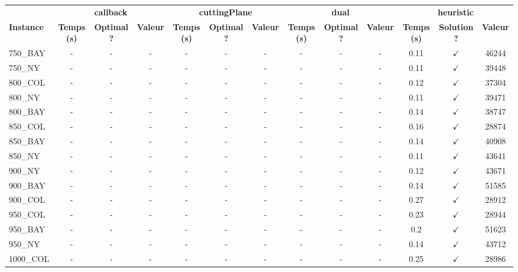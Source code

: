 \documentclass[main.tex]{subfiles}
\begin{document}
\begin{landscape}
\begin{center}
\renewcommand{\arraystretch}{1.4} 
 \begin{tabular}{lcccccccccccc}
	\hline
 & \multicolumn{3}{c}{\textbf{callback}} & \multicolumn{3}{c}{\textbf{cuttingPlane}} & \multicolumn{3}{c}{\textbf{dual}} & \multicolumn{3}{c}{\textbf{heuristic}}\\
\textbf{Instance}  & \textbf{Temps (s)} & \textbf{Optimal ?} & \textbf{Valeur} & \textbf{Temps (s)} & \textbf{Optimal ?} & \textbf{Valeur} & \textbf{Temps (s)} & \textbf{Optimal ?} & \textbf{Valeur} & \textbf{Temps (s)} & \textbf{Solution ?} & \textbf{Valeur}\\\hline

750\_BAY & - & - & - 
 & - & - & - 
 & - & - & - 
 & 0.11 & $\checkmark$ & 46244\\
750\_NY & - & - & - 
 & - & - & - 
 & - & - & - 
 & 0.11 & $\checkmark$ & 39448\\
800\_COL & - & - & - 
 & - & - & - 
 & - & - & - 
 & 0.12 & $\checkmark$ & 37304\\
800\_NY & - & - & - 
 & - & - & - 
 & - & - & - 
 & 0.11 & $\checkmark$ & 39471\\
800\_BAY & - & - & - 
 & - & - & - 
 & - & - & - 
 & 0.14 & $\checkmark$ & 38747\\
850\_COL & - & - & - 
 & - & - & - 
 & - & - & - 
 & 0.16 & $\checkmark$ & 28874\\
850\_BAY & - & - & - 
 & - & - & - 
 & - & - & - 
 & 0.14 & $\checkmark$ & 40908\\
850\_NY & - & - & - 
 & - & - & - 
 & - & - & - 
 & 0.11 & $\checkmark$ & 43641\\
900\_NY & - & - & - 
 & - & - & - 
 & - & - & - 
 & 0.12 & $\checkmark$ & 43671\\
900\_BAY & - & - & - 
 & - & - & - 
 & - & - & - 
 & 0.14 & $\checkmark$ & 51585\\
900\_COL & - & - & - 
 & - & - & - 
 & - & - & - 
 & 0.27 & $\checkmark$ & 28912\\
950\_COL & - & - & - 
 & - & - & - 
 & - & - & - 
 & 0.23 & $\checkmark$ & 28944\\
950\_BAY & - & - & - 
 & - & - & - 
 & - & - & - 
 & 0.2 & $\checkmark$ & 51623\\
950\_NY & - & - & - 
 & - & - & - 
 & - & - & - 
 & 0.14 & $\checkmark$ & 43712\\
1000\_COL & - & - & - 
 & - & - & - 
 & - & - & - 
 & 0.25 & $\checkmark$ & 28986\\

\end{tabular}
\end{center}
\end{landscape}
\end{document}
